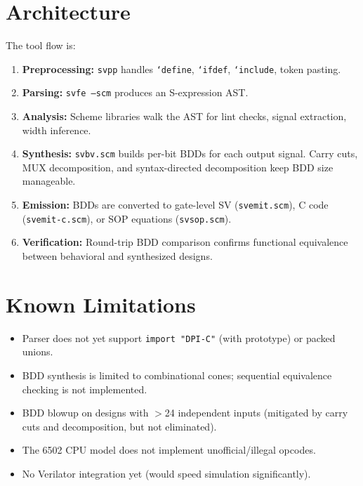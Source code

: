 \documentclass[11pt]{article}
\begin{document}
\section{Architecture}

The tool flow is:

\begin{enumerate}[nosep]
\item \textbf{Preprocessing:} \texttt{svpp} handles \texttt{`define},
  \texttt{`ifdef}, \texttt{`include}, token pasting.
\item \textbf{Parsing:} \texttt{svfe --scm} produces an S-expression AST.
\item \textbf{Analysis:} Scheme libraries walk the AST for lint checks,
  signal extraction, width inference.
\item \textbf{Synthesis:} \texttt{svbv.scm} builds per-bit BDDs for
  each output signal.  Carry cuts, MUX decomposition, and
  syntax-directed decomposition keep BDD size manageable.
\item \textbf{Emission:} BDDs are converted to gate-level SV
  (\texttt{svemit.scm}), C code (\texttt{svemit-c.scm}), or SOP
  equations (\texttt{svsop.scm}).
\item \textbf{Verification:} Round-trip BDD comparison confirms
  functional equivalence between behavioral and synthesized designs.
\end{enumerate}

\section{Known Limitations}

\begin{itemize}[nosep]
\item Parser does not yet support \texttt{import "DPI-C"} (with prototype)
  or packed unions.
\item BDD synthesis is limited to combinational cones; sequential
  equivalence checking is not implemented.
\item BDD blowup on designs with $>$24 independent inputs
  (mitigated by carry cuts and decomposition, but not eliminated).
\item The 6502 CPU model does not implement unofficial/illegal opcodes.
\item No Verilator integration yet (would speed simulation significantly).
\end{itemize}
\end{document}
